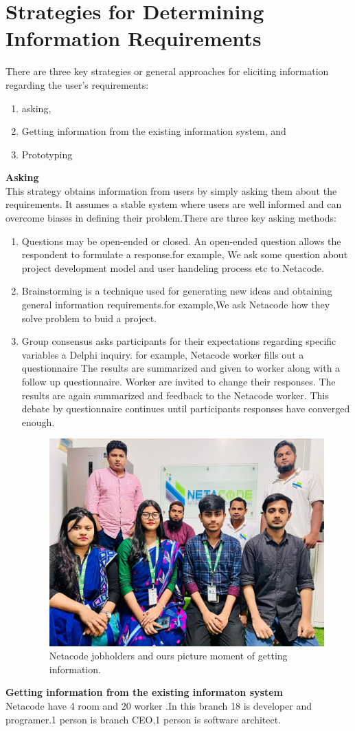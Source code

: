 \documentclass[a4paper,12pt]{report}
\begin{document}
\section{Strategies for Determining Information Requirements}
There are three key strategies or general approaches for eliciting information regarding the user's requirements:
\begin{enumerate}
	\item asking, \item Getting information from the existing information system, and \item Prototyping 
\end{enumerate}
\textbf{Asking} \\This strategy obtains information from users by simply asking them about the requirements. It assumes a stable system where users are well informed and can overcome biases in defining their problem.There are three key asking methods:
\begin{enumerate}
	\item Questions may be open-ended or closed. An open-ended question allows the respondent to formulate a response.for example, We ask some question about project development model and user handeling process etc to Netacode.
	\item Brainstorming is a technique used for generating new ideas and obtaining general information requirements.for example,We ask Netacode how they solve problem to buid a project.
	\item Group consensus asks participants for their expectations regarding specific variables a Delphi inquiry. for example,  Netacode worker  fills out a questionnaire The results are  summarized and given to worker along with a follow up questionnaire. Worker are invited to change their responses. The results are again summarized and feedback to the Netacode worker. This debate by questionnaire continues until participants responses have converged enough.
	
\begin{figure}[h]
	\centering
	\includegraphics[width=0.8\linewidth]{"amader pic"}
	\caption{Netacode jobholders and ours picture moment of getting information.}
	\label{fig:amader-pic}
\end{figure}
\end{enumerate}
\textbf{Getting information from the existing informaton system}
\\Netacode have 4 room and 20 worker .In this branch 18 is developer and programer.1 person is branch CEO,1 person is software architect.
\end{document}
